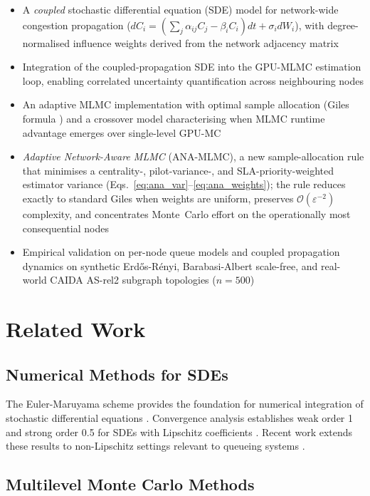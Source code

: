 \documentclass{ieeeaccess}
\begin{document}
\begin{itemize}
    \item A \emph{coupled} stochastic differential equation (SDE) model for network-wide
    congestion propagation ($dC_i = (\sum_j \alpha_{ij}C_j - \beta_i C_i)dt + \sigma_i dW_i$),
    with degree-normalised influence weights derived from the network adjacency matrix
    \cite{kang2007, harrison1985}
    \item Integration of the coupled-propagation SDE into the GPU-MLMC estimation loop,
    enabling correlated uncertainty quantification across neighbouring nodes
    \item An adaptive MLMC implementation with optimal sample allocation (Giles formula
    \cite{giles2015multilevel, collier2015}) and a crossover model characterising when MLMC
    runtime advantage emerges over single-level GPU-MC
    \item \emph{Adaptive Network-Aware MLMC} (ANA-MLMC), a new sample-allocation rule that
    minimises a centrality-, pilot-variance-, and SLA-priority-weighted estimator variance
    (Eqs.~\eqref{eq:ana_var}--\eqref{eq:ana_weights}); the rule reduces exactly to standard
    Giles when weights are uniform, preserves $\mathcal{O}(\varepsilon^{-2})$ complexity, and
    concentrates Monte~Carlo effort on the operationally most consequential nodes
    \item Empirical validation on per-node queue models and coupled propagation dynamics on
    synthetic Erd\H{o}s-R\'enyi, Barabasi-Albert scale-free, and real-world CAIDA AS-rel2
    subgraph topologies ($n=500$)
\end{itemize}

\section{Related Work}

\subsection{Numerical Methods for SDEs}

The Euler-Maruyama scheme provides the foundation for numerical integration of stochastic
differential equations \cite{kloeden1992}. Convergence analysis establishes weak order 1 and
strong order 0.5 for SDEs with Lipschitz coefficients \cite{khasminskii2012}. Recent work
extends these results to non-Lipschitz settings relevant to queueing systems \cite{bossy2021}.

\subsection{Multilevel Monte Carlo Methods}
\end{document}
